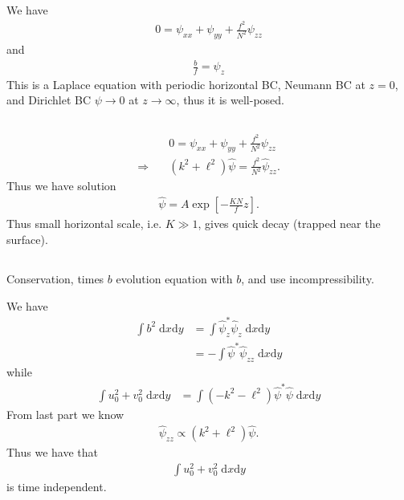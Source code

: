 \documentclass[11pt,letterpaper]{book}
\theoremstyle{definition}
\newcommand{\de}{\mathrm{d}}
\newcommand{\thus}{\Rightarrow \quad }
\begin{document}
\subsection{}
We have
\begin{align*}
    0 = \psi_{xx}+\psi_{yy}+\frac{f^2}{N^2}\psi_{zz}
\end{align*}
and
\begin{align*}
    \frac{b}{f} = \psi_z
\end{align*}
This is a Laplace equation with periodic horizontal BC, Neumann BC at $z=0$, and Dirichlet BC $\psi\to 0$ at $z\to \infty$, thus it is well-posed.

\subsection{}
\begin{align*}
    &0 = \psi_{xx}+\psi_{yy}+\frac{f^2}{N^2}\psi_{zz}\\
    \thus &(k^2+\ell^2)\hat{\psi} = \frac{f^2}{N^2}\hat\psi_{zz}.
\end{align*}
Thus we have solution
\begin{align*}
    \hat{\psi} = A\exp\left[-\frac{KN}{f}z\right].
\end{align*}
Thus small horizontal scale, i.e. $K\gg 1$, gives quick decay (trapped near the surface).

\subsection{}
Conservation, times $b$ evolution equation with $b$, and use incompressibility.

We have
\begin{align*}
    \int b^2\;\de x\de y &= \int \hat{\psi}_z^*\hat{\psi}_z\;\de x\de y\\
    &= -\int \hat{\psi}^*\hat{\psi}_{zz}\;\de x\de y
\end{align*}
while
\begin{align*}
    \int u_0^2+v_0^2\;\de x\de y &= \int (-k^2-\ell^2)\hat{\psi}^*\hat{\psi}\;\de x\de y
\end{align*}
From last part we know
\begin{align*}
    \hat{\psi}_{zz}\propto (k^2+\ell^2)\hat{\psi}.
\end{align*}
Thus we have that
\begin{align*}
    \int u_0^2+v_0^2\;\de x\de y
\end{align*}
is time independent.
\end{document}
